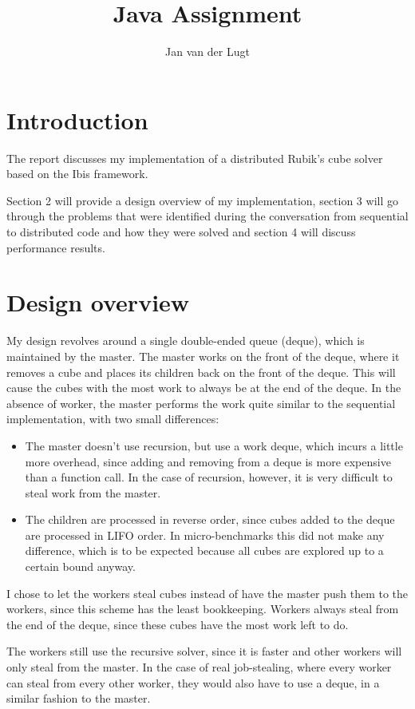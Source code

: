 \documentclass[11pt,a4paper]{article}
\title{Java Assignment}
\author{Jan van der Lugt}
\date{}
\begin{document}
\maketitle

\section{Introduction}
The report discusses my implementation of a distributed Rubik's cube solver based on the Ibis framework.

Section 2 will provide a design overview of my implementation, section 3 will go through the problems that were identified during the conversation from sequential to distributed code and how they were solved and section 4 will discuss performance results.

\section{Design overview}
My design revolves around a single double-ended queue (deque), which is maintained by the master. The master works on the front of the deque, where it removes a cube and places its children back on the front of the deque. This will cause the cubes with the most work to always be at the end of the deque. In the absence of worker, the master performs the work quite similar to the sequential implementation, with two small differences:
\begin{itemize}
\item The master doesn't use recursion, but use a work deque, which incurs a little more overhead, since adding and removing from a deque is more expensive than a function call. In the case of recursion, however, it is very difficult to steal work from the master.
\item The children are processed in reverse order, since cubes added to the deque are processed in LIFO order. In micro-benchmarks this did not make any difference, which is to be expected because all cubes are explored up to a certain bound anyway.
\end{itemize}
I chose to let the workers steal cubes instead of have the master push them to the workers, since this scheme has the least bookkeeping. Workers always steal from the end of the deque, since these cubes have the most work left to do.

The workers still use the recursive solver, since it is faster and other workers will only steal from the master. In the case of real job-stealing, where every worker can steal from every other worker, they would also have to use a deque, in a similar fashion to the master.
\end{document}

